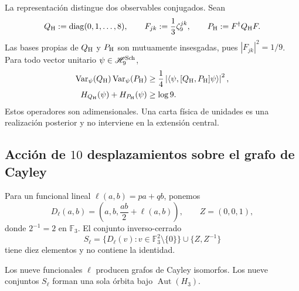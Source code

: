 La representación distingue dos observables conjugados. Sean
\[
 Q_{\rm H}:=\operatorname{diag}(0,1,\ldots,8),
 \qquad
 F_{jk}:=\frac13\zeta_9^{jk},
 \qquad
 P_{\rm H}:=F^\dagger Q_{\rm H}F.
\]
Las bases propias de \(Q_{\rm H}\) y \(P_{\rm H}\) son mutuamente
insesgadas, pues \(|F_{jk}|^2=1/9\). Para todo vector unitario
\(\psi\in\mathscr H_9^{\rm Sch}\),
\begin{align}
 \operatorname{Var}_\psi(Q_{\rm H})
 \operatorname{Var}_\psi(P_{\rm H})
 &\ge
 \frac14\left|
 \langle\psi,[Q_{\rm H},P_{\rm H}]\psi\rangle
 \right|^2,
 \label{p12-83-c20-s6:eq:incertidumbre-weyl-u029}\\
 H_{Q_{\rm H}}(\psi)+H_{P_{\rm H}}(\psi)
 &\ge\log9.
 \label{p12-83-c20-s6:eq:incertidumbre-entropica-weyl-u029}
\end{align}
Estos operadores son adimensionales. Una carta física de unidades es una
realización posterior y no interviene en la extensión central.

\subsection{Acción de \(10\) desplazamientos sobre el grafo de Cayley}

Para un funcional lineal
\(\ell(a,b)=pa+qb\), ponemos
\[
 D_\ell(a,b)=\left(a,b,\frac{ab}{2}+\ell(a,b)\right),
 \qquad Z=(0,0,1),
\]
donde \(2^{-1}=2\) en \(\mathbb F_3\). El conjunto inverso-cerrado
\begin{equation}
 S_\ell=
 \{D_\ell(v):v\in\mathbb F_3^2\setminus\{0\}\}
 \cup\{Z,Z^{-1}\}
 \label{p12-83-c20-s6:eq:conjunto-conexion-e6}
\end{equation}
tiene diez elementos y no contiene la identidad.

\begin{theorem}
\label{p12-83-c20-s6:thm:independencia-calibre-e6}
Los nueve funcionales \(\ell\) producen grafos de Cayley isomorfos. Los
nueve conjuntos \(S_\ell\) forman una sola órbita bajo
\(\operatorname{Aut}(H_3)\).
\end{theorem}

